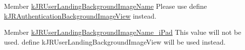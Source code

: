 \label{deprecated__deprecated000007}
\hypertarget{deprecated__deprecated000007}{}
 
\begin{DoxyDescription}
\item[Member \hyperlink{group__custom_interface_gadda3f945ba5012762eb92764b251b918}{kJRUserLandingBackgroundImageName} ]Please use define \hyperlink{group__custom_interface_ga68a4950b1b3834ce60218856f596059f}{kJRAuthenticationBackgroundImageView} instead. 
\end{DoxyDescription}

\label{deprecated__deprecated000010}
\hypertarget{deprecated__deprecated000010}{}
 
\begin{DoxyDescription}
\item[Member \hyperlink{group__custom_interface_ga52b4fb3801cf3fe6e5a294d9a4d1ff0a}{kJRUserLandingBackgroundImageName\_\-iPad} ]This value will not be used. define kJRUserLandingBackgroundImageView will be used instead. 
\end{DoxyDescription}